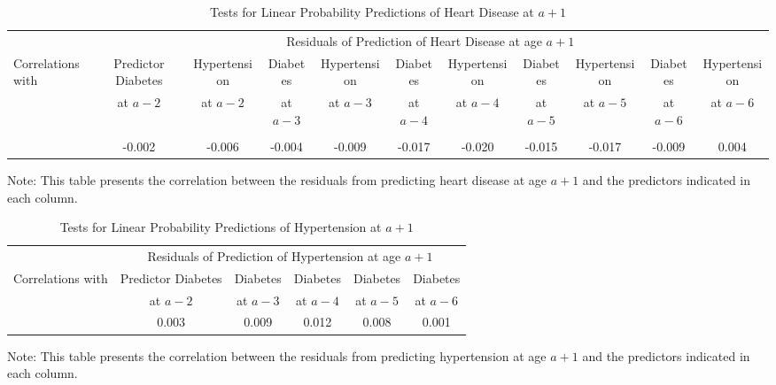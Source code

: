 \begin{landscape}

\begin{table}[H]
\begin{threeparttable}
\caption{Tests for Linear Probability Predictions of Heart Disease at $a+1$} \label{table:1storderresidsheart}
\scriptsize
\centering
\begin{tabular}{lcccccccccc} \toprule
& \multicolumn{10}{c}{Residuals of Prediction of Heart Disease at age $a+1$} \\
Correlations with	&	Predictor Diabetes &	Hypertension &	Diabetes &	Hypertension &	Diabetes	&	Hypertension &	Diabetes & Hypertension & Diabetes & Hypertension \\
                    &	at $a - 2$ &	at $a - 2$		&	at $a - 3$ & at $a - 3$		& at $a - 4$		& at $a - 4$		& at $a - 5$	& at $a - 5$	& at $a - 6$	& at $a - 6$	\\

\midrule \\
&	-0.002	&	-0.006	&	-0.004	& -0.009 &	-0.017	& -0.020	&	-0.015	&	-0.017 &-0.009	&	0.004	\\
\bottomrule
\end{tabular}
\begin{tablenotes}
\footnotesize
\item Note: This table presents the correlation between the residuals from predicting heart disease at age $a+1$ and the predictors indicated in each column.
\end{tablenotes}
\end{threeparttable}
\end{table}

\begin{table}[H]
\begin{threeparttable}
\caption{Tests for Linear Probability Predictions of Hypertension at $a+1$} \label{table:1storderresidshyper}
\centering
\scriptsize
\begin{tabular}{lccccc} \toprule
& \multicolumn{5}{c}{Residuals of Prediction of Hypertension at age $a+1$} \\
Correlations with	&	Predictor Diabetes & Diabetes & Diabetes & Diabetes & Diabetes 	\\
                    & at $a - 2$	& at $a - 3$	& at $a - 4$	& at $a - 5$	& at $a - 6$	\\
\midrule
&	0.003	& 0.009	&	0.012	&	0.008	&	0.001	\\
\bottomrule
\end{tabular}
\begin{tablenotes}
\footnotesize
\item Note: This table presents the correlation between the residuals from predicting hypertension at age $a+1$ and the predictors indicated in each column.
\end{tablenotes}
\end{threeparttable}
\end{table}


\end{landscape}
